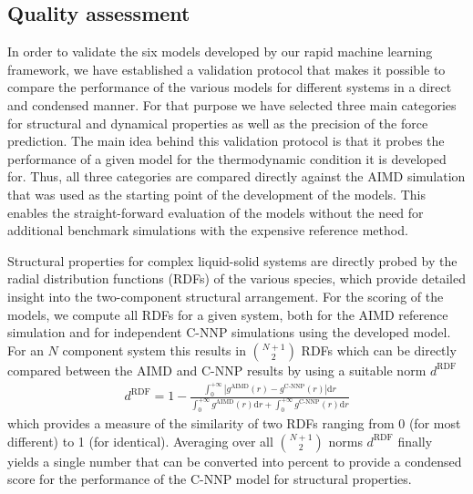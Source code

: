\documentclass[aip,jcp,amsmath,amssymb,floatfix,reprint,citeautoscript,noeprint]{revtex4-1}
\begin{document}
\begin{bibunit}

\section*{Quality assessment}
\label{sec:scoring}
%

%
In order to validate the six models
developed by our rapid machine learning framework,
we have established a validation protocol
that makes it possible to compare the performance
of the various models for different systems
in a direct and condensed manner.
%
For that purpose we have selected three main categories
for structural and dynamical properties as well as
the precision of the force prediction.
%
The main idea behind this validation protocol
is that it probes the performance of a given
model for the thermodynamic condition it
is developed for.
%
Thus, all three categories are compared
directly against the AIMD simulation that
was used as the starting point of the development of
the models.
%
This enables the straight-forward evaluation of the
models without the need for additional benchmark
simulations with the expensive reference method.

%
Structural properties for complex liquid-solid
systems are directly probed by the
radial distribution functions (RDFs) of the various species,
which provide detailed insight into the two-component
structural arrangement.
%
For the scoring of the models, we compute all RDFs
for a given system, both for the AIMD reference simulation
and for independent C-NNP simulations using the developed
model.
%
For an $N$ component system this results in $\binom{N+1}{2}$ RDFs
which can be directly compared between the AIMD and
C-NNP results by using a suitable norm $d^\text{RDF}$
\begin{align}
    d^\text{RDF} = 1 - \frac{\int_{0}^{+\infty} \left| g^\text{AIMD}(r)-g^\text{C-NNP}(r)\right|\text{d}r}
             {\int_{0}^{+\infty}g^\text{AIMD}(r) \text{d}r + \int_{0}^{+\infty}g^\text{C-NNP}(r)\text{d}r}
\end{align}
which provides a measure of the similarity of two RDFs
ranging from 0 (for most different) to 1 (for identical).
%
Averaging over all $\binom{N+1}{2}$ norms $d^\text{RDF}$ finally
yields a single number that can be converted into percent
to provide a condensed score for the performance
of the C-NNP model for structural properties.


\end{bibunit}
\end{document}
